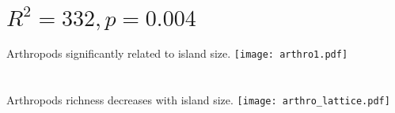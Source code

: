 \documentclass[t]{beamer}
\begin{document}
\section{}
\subsection{}

\section{$R^2 = 332, p = 0.004$}


\begin{frame}{Arthropods significantly related to island size.}
	\centering
		\texttt{[image: arthro1.pdf]}
\end{frame}
\section{}
\subsection{}


\begin{frame}{Arthropods richness decreases with island size.}
	\centering
		\texttt{[image: arthro\_lattice.pdf]}
\end{frame}
\end{document}
